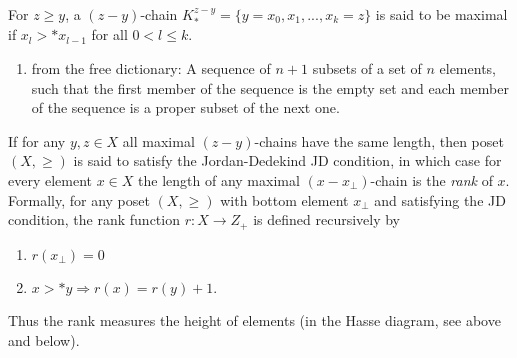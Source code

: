 	For $z \ge y$, a $(z-y)$-chain $K_{*}^{z-y} = \{y=x_0, x_1, ..., x_k = z\}$ is said to be maximal if $x_l >* x_{l-1}$ for all $0 < l \le k$.
	    \begin{enumerate}
	     \item from the free dictionary: A sequence of $n+1$ subsets of a set of $n$ elements, such that the first member of the sequence is the empty set and each member of the sequence is a proper subset of the next one.
	    \end{enumerate}

	    
	If for any $y, z \in X$ all maximal $(z-y)$-chains have the same length, then poset $(X, \ge)$ is said to satisfy the Jordan-Dedekind JD condition, in which case for every element $x \in X$ the length of any maximal $(x-x_{\bot})$-chain is the \emph{rank} of $x$. Formally, for any poset $(X, \ge)$ with bottom element $x_{\bot}$ and satisfying the JD condition, the rank function $r: X \to Z_+$ is defined recursively by
	
	\begin{enumerate}
	 \item $r(x_{\bot}) = 0$
	 \item $x >* y \Rightarrow r(x) = r(y)+1$.
	\end{enumerate}
	Thus the rank measures the height of elements (in the Hasse diagram, see above and below).




